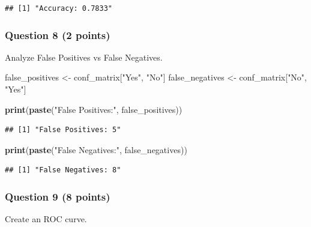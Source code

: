 \documentclass[
]{article}
\newenvironment{Shaded}{\begin{snugshade}}{\end{snugshade}}
\newcommand{\FunctionTok}[1]{\textcolor[rgb]{0.13,0.29,0.53}{\textbf{#1}}}
\newcommand{\NormalTok}[1]{#1}
\newcommand{\OtherTok}[1]{\textcolor[rgb]{0.56,0.35,0.01}{#1}}
\newcommand{\StringTok}[1]{\textcolor[rgb]{0.31,0.60,0.02}{#1}}
\begin{document}
\begin{verbatim}
## [1] "Accuracy: 0.7833"
\end{verbatim}

\subsubsection{Question 8 (2 points)}\label{question-8-2-points}

Analyze False Positives vs False Negatives.

\begin{Shaded}
\begin{Highlighting}[]
\NormalTok{false\_positives }\OtherTok{\textless{}{-}}\NormalTok{ conf\_matrix[}\StringTok{"Yes"}\NormalTok{, }\StringTok{"No"}\NormalTok{]}
\NormalTok{false\_negatives }\OtherTok{\textless{}{-}}\NormalTok{ conf\_matrix[}\StringTok{"No"}\NormalTok{, }\StringTok{"Yes"}\NormalTok{]}

\FunctionTok{print}\NormalTok{(}\FunctionTok{paste}\NormalTok{(}\StringTok{"False Positives:"}\NormalTok{, false\_positives))}
\end{Highlighting}
\end{Shaded}

\begin{verbatim}
## [1] "False Positives: 5"
\end{verbatim}

\begin{Shaded}
\begin{Highlighting}[]
\FunctionTok{print}\NormalTok{(}\FunctionTok{paste}\NormalTok{(}\StringTok{"False Negatives:"}\NormalTok{, false\_negatives))}
\end{Highlighting}
\end{Shaded}

\begin{verbatim}
## [1] "False Negatives: 8"
\end{verbatim}

\subsubsection{Question 9 (8 points)}\label{question-9-8-points}

Create an ROC curve.
\end{document}
